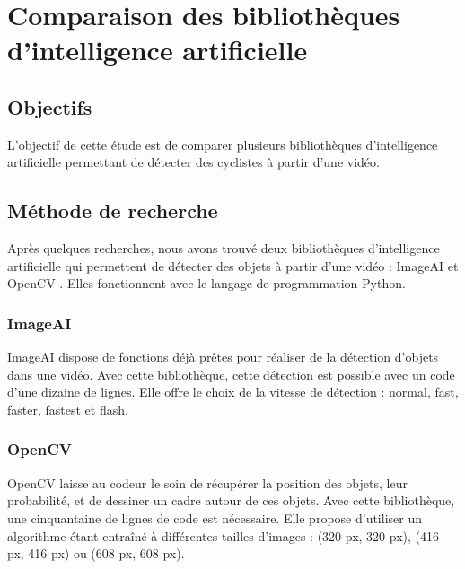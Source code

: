 \section{Comparaison des bibliothèques d'intelligence artificielle}
\label{sec:comparaisonIA}

\subsection{Objectifs}
\label{sec:comparaisonIA:objectifs}

L'objectif de cette étude est de comparer plusieurs bibliothèques d'intelligence artificielle
permettant de détecter des cyclistes à partir d'une vidéo.

\subsection{Méthode de recherche}
\label{sec:comparaisonIA:methode_recherche}

Après quelques recherches, nous avons trouvé deux bibliothèques d'intelligence artificielle
qui permettent de détecter des objets à partir d'une vidéo : ImageAI et OpenCV \cite{ImageAI_site_officiel, OpenCV_site_officiel}.
Elles fonctionnent avec le langage de programmation Python.

\subsubsection{ImageAI}
\label{sec:comparaisonIA:methode_recherche:imageAI}

ImageAI dispose de fonctions déjà prêtes pour réaliser de la détection d'objets dans une vidéo.
Avec cette bibliothèque, cette détection est possible avec un code d'une dizaine de lignes.
Elle offre le choix de la vitesse de détection : normal, fast, faster, fastest et flash.

\subsubsection{OpenCV}
\label{sec:comparaisonIA:methode_recherche:openCV}

OpenCV laisse au codeur le soin de récupérer la position des objets, leur probabilité, et de dessiner un cadre autour de ces objets.
Avec cette bibliothèque, une cinquantaine de lignes de code est nécessaire.
Elle propose d'utiliser un algorithme étant entraîné à différentes tailles d'images : (320 px, 320 px), (416 px, 416 px) ou (608 px, 608 px).

